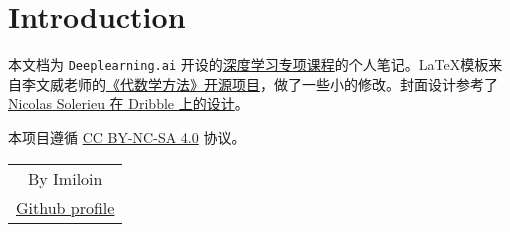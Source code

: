 \chapter*{Introduction}
	本文档为 \nolinkurl{Deeplearning.ai} 开设的\href{https://www.coursera.org/specializations/deep-learning}{深度学习专项课程}的个人笔记。\LaTeX 模板来自李文威老师的\href{https://github.com/wenweili/AlJabr-1}{《代数学方法》开源项目}，做了一些小的修改。封面设计参考了 \href{https://dribbble.com/shots/17836795-Minimal-posters}{Nicolas Solerieu 在 Dribble 上的设计}。

	本项目遵循 \href{https://creativecommons.org/licenses/by-nc-sa/4.0/}{CC BY-NC-SA 4.0} 协议。
	\vspace{1em}
	\begin{flushright}\begin{minipage}{0.2 \textwidth}
		\begin{tabular}{c}
			{By Imiloin} \\
			\href{https://github.com/Imiloin}{Github profile}\\
		\end{tabular}
	\end{minipage}\end{flushright}

